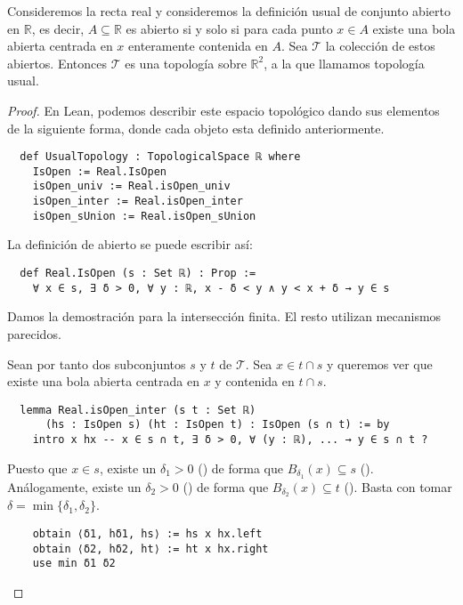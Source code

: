 \begin{example}

  Consideremos la recta real y consideremos la definición usual de conjunto abierto en $\mathbb{R}$, es decir, $A \subseteq \mathbb{R}$ es abierto si y solo si para cada punto $x \in A$ existe una bola abierta centrada en $x$ enteramente contenida en $A$. Sea $\mathcal{T}$ la colección de estos abiertos. Entonces $\mathcal{T}$ es una topología sobre $\mathbb{R}^2$, a la que llamamos \textnormal{topología usual}.
\end{example}

\begin{proof}
  En Lean, podemos describir este espacio topológico dando sus elementos de la siguiente forma, donde cada objeto esta definido anteriormente.

  
  \begin{lstlisting}
  def UsualTopology : TopologicalSpace ℝ where
    IsOpen := Real.IsOpen
    isOpen_univ := Real.isOpen_univ
    isOpen_inter := Real.isOpen_inter
    isOpen_sUnion := Real.isOpen_sUnion \end{lstlisting}
  
  La definición de abierto se puede escribir así:

  \begin{lstlisting}
  def Real.IsOpen (s : Set ℝ) : Prop :=
    ∀ x ∈ s, ∃ δ > 0, ∀ y : ℝ, x - δ < y ∧ y < x + δ → y ∈ s \end{lstlisting}

  Damos la demostración para la intersección finita. El resto utilizan mecanismos parecidos.

  Sean por tanto dos subconjuntos $s$ y $t$ de $\mathcal{T}$. Sea $x \in t \cap s$ y queremos ver que existe una bola abierta centrada en $x$ y contenida en $t \cap s$.

  \begin{lstlisting}
  lemma Real.isOpen_inter (s t : Set ℝ)
      (hs : IsOpen s) (ht : IsOpen t) : IsOpen (s ∩ t) := by
    intro x hx -- x ∈ s ∩ t, ∃ δ > 0, ∀ (y : ℝ), ... → y ∈ s ∩ t ? \end{lstlisting}

  Puesto que $x \in s$, existe un $\delta_1>0$ () de forma que $B_{\delta_1}(x) \subseteq s$ (). Análogamente, existe un $\delta_2>0$ () de forma que $B_{\delta_2}(x) \subseteq t$ (). Basta con tomar $\delta = \min \{\delta_1, \delta_2\}$.

  \begin{lstlisting}
    obtain ⟨δ1, hδ1, hs⟩ := hs x hx.left
    obtain ⟨δ2, hδ2, ht⟩ := ht x hx.right
    use min δ1 δ2 \end{lstlisting}


\end{proof}
